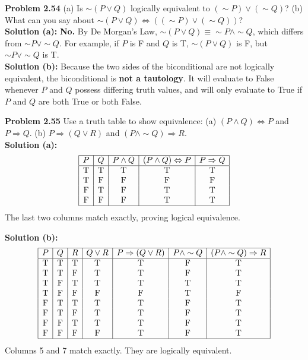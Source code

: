 \documentclass{article}
\begin{document}
\vspace{1em}
\textbf{Problem 2.54} (a) Is $\sim(P \lor Q)$ logically equivalent to $(\sim P) \lor (\sim Q)$? (b) What can you say about $\sim(P \lor Q) \Leftrightarrow ((\sim P) \lor (\sim Q))$?
\\[0.5em]
\textbf{Solution (a):} \textbf{No.} By De Morgan's Law, $\sim(P \lor Q) \equiv \sim P \land \sim Q$, which differs from $\sim P \lor \sim Q$. For example, if $P$ is F and $Q$ is T, $\sim(P \lor Q)$ is F, but $\sim P \lor \sim Q$ is T.
\\
\textbf{Solution (b):} Because the two sides of the biconditional are not logically equivalent, the biconditional is \textbf{not a tautology}. It will evaluate to False whenever $P$ and $Q$ possess differing truth values, and will only evaluate to True if $P$ and $Q$ are both True or both False.

\vspace{1em}
\textbf{Problem 2.55} Use a truth table to show equivalence:
(a) $(P \land Q) \Leftrightarrow P$ and $P \Rightarrow Q$.
(b) $P \Rightarrow (Q \lor R)$ and $(P \land \sim Q) \Rightarrow R$.
\\[0.5em]
\textbf{Solution (a):}
\[
\begin{array}{|c|c|c|c|c|}
\hline
P & Q & P \land Q & (P \land Q) \Leftrightarrow P & P \Rightarrow Q \\
\hline
\text{T} & \text{T} & \text{T} & \text{T} & \text{T} \\
\text{T} & \text{F} & \text{F} & \text{F} & \text{F} \\
\text{F} & \text{T} & \text{F} & \text{T} & \text{T} \\
\text{F} & \text{F} & \text{F} & \text{T} & \text{T} \\
\hline
\end{array}
\]
The last two columns match exactly, proving logical equivalence.

\textbf{Solution (b):}
\[
\begin{array}{|c|c|c|c|c|c|c|c|}
\hline
P & Q & R & Q \lor R & P \Rightarrow (Q \lor R) & P \land \sim Q & (P \land \sim Q) \Rightarrow R \\
\hline
\text{T} & \text{T} & \text{T} & \text{T} & \text{T} & \text{F} & \text{T} \\
\text{T} & \text{T} & \text{F} & \text{T} & \text{T} & \text{F} & \text{T} \\
\text{T} & \text{F} & \text{T} & \text{T} & \text{T} & \text{T} & \text{T} \\
\text{T} & \text{F} & \text{F} & \text{F} & \text{F} & \text{T} & \text{F} \\
\text{F} & \text{T} & \text{T} & \text{T} & \text{T} & \text{F} & \text{T} \\
\text{F} & \text{T} & \text{F} & \text{T} & \text{T} & \text{F} & \text{T} \\
\text{F} & \text{F} & \text{T} & \text{T} & \text{T} & \text{F} & \text{T} \\
\text{F} & \text{F} & \text{F} & \text{F} & \text{T} & \text{F} & \text{T} \\
\hline
\end{array}
\]
Columns 5 and 7 match exactly. They are logically equivalent.
\end{document}
